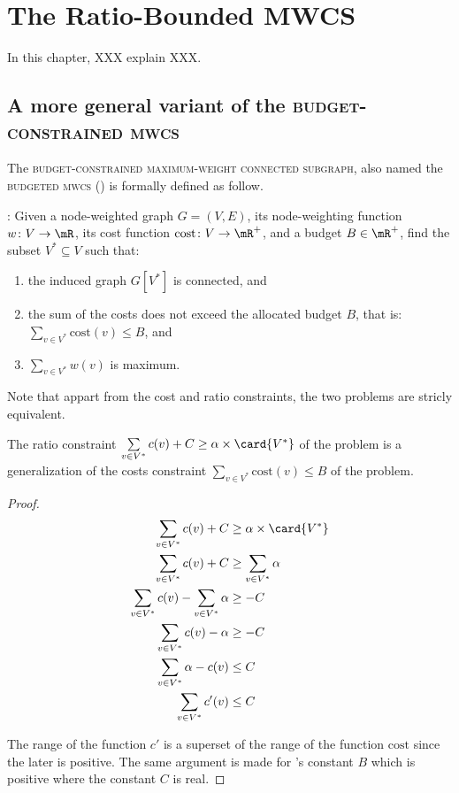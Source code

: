 \chapter{The Ratio-Bounded MWCS}
\label{chap:rbmwcs}

	In this chapter, XXX explain XXX.

	\section{A more general variant of the \textsc{budget-constrained mwcs}}
		The \textsc{budget-constrained maximum-weight connected subgraph}, also named the \textsc{budgeted mwcs} (\bcmwcs{}) is formally defined as follow.
		
		\textbf{\bcmwcs{}}: Given a node-weighted graph $G = (V, E)$, its node-weighting function $w\colon V \to \mR$, its cost function $\text{cost}\colon V \to \mR^+$, and a budget $B \in \mR^+$, find the subset $V^* \subseteq V$ such that:
		\begin{enumerate}
			\item the induced graph $G\left[V^*\right]$ is connected, and
			\item the sum of the costs does not exceed the allocated budget $B$, that is:\\
				$\sum\limits_{v \in V^*}{\text{cost}(v)} \leq B$, and
			\item $\sum\limits_{v \in V^*}{w(v)}$ is maximum.
		\end{enumerate}

		Note that appart from the cost and ratio constraints, the two problems are stricly equivalent.

		\begin{proposition}
			The ratio constraint $\sum\limits_{v \in V^*}{c(v)} + C \geq \alpha\times\card{V^*}$ of the \rbmwcs{} problem is a generalization of the costs constraint $\sum\limits_{v \in V^*}{\text{cost}(v)} \leq B$ of the \bcmwcs{} problem.
		\end{proposition}

		\begin{proof}
			\begin{align*}
				\sum\limits_{v \in V^*}{c(v)} + C &\geq \alpha\times\card{V^*} \\
				\sum\limits_{v \in V^*}{c(v)} + C &\geq \sum\limits_{v \in V^*}{\alpha} \\
				\sum\limits_{v \in V^*}{c(v)} - \sum\limits_{v \in V^*}{\alpha} &\geq -C \\
				\sum\limits_{v \in V^*}{c(v) - \alpha} &\geq -C \\
				\sum\limits_{v \in V^*}{\alpha - c(v)} &\leq C \\
				\sum\limits_{v \in V^*}{c'(v)} &\leq C \\
			\end{align*}

			The range of the function $c'$ is a superset of the range of the function $\text{cost}$ since the later is positive.
			The same argument is made for \bcmwcs{}'s constant $B$ which is positive where the constant $C$ is real.
		\end{proof}

